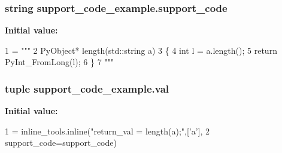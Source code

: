 \subsubsection[{support\+\_\+code}]{\setlength{\rightskip}{0pt plus 5cm}string support\+\_\+code\+\_\+example.\+support\+\_\+code}\label{namespacesupport__code__example_aed624a56fcf79a32b749f811d0373720}
{\bfseries Initial value\+:}
\begin{DoxyCode}
1 = \textcolor{stringliteral}{"""}
2 \textcolor{stringliteral}{               PyObject* length(std::string a)}
3 \textcolor{stringliteral}{               \{}
4 \textcolor{stringliteral}{                   int l = a.length();}
5 \textcolor{stringliteral}{                   return PyInt\_FromLong(l);}
6 \textcolor{stringliteral}{               \}}
7 \textcolor{stringliteral}{               """}
\end{DoxyCode}
\hypertarget{namespacesupport__code__example_a391bf8800a4f981c5a71596f6481b687}{}
\subsubsection[{val}]{\setlength{\rightskip}{0pt plus 5cm}tuple support\+\_\+code\+\_\+example.\+val}\label{namespacesupport__code__example_a391bf8800a4f981c5a71596f6481b687}
{\bfseries Initial value\+:}
\begin{DoxyCode}
1 = inline\_tools.inline(\textcolor{stringliteral}{"return\_val = length(a);"},[\textcolor{stringliteral}{'a'}],
2                           support\_code=support\_code)
\end{DoxyCode}

